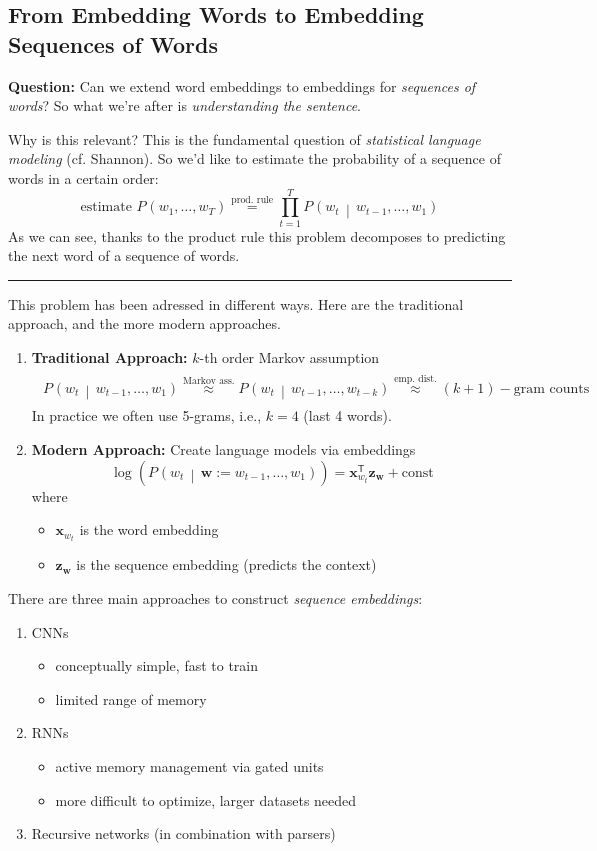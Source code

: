 \documentclass[a2paper,8pt]{extarticle}
\newcommand\pro{\item[$+$]}
\newcommand\con{\item[$-$]}
\newcommand{\Prob}[2][]{P_{#1}\left( #2 \right)}
\newcommand{\cProb}[3][]{P_{#1}\left( #2 \,\middle|\, #3 \right)}
\newcommand*{\T}{\mathsf{T}}
\renewcommand{\vec}[1]{\mathbf{#1}}
\newcommand{\vw}{\vec{w}}
\newcommand{\vx}{\vec{x}}
\newcommand{\vz}{\vec{z}}
\newcommand{\sep}{\vspace{0pt}\noindent\hrule\vspace{0pt}}
\newcommand{\ssep}{\hdashrule[1.1ex]{\linewidth}{0.1pt}{0.3mm}\vspace{-6pt}}
\newcommand{\sep}{\vspace{5pt}\noindent\hrule\vspace{5pt}}
\newcommand{\ssep}{\hdashrule[1.1ex]{\linewidth}{0.1pt}{0.3mm}\vspace{-3pt}}
\begin{document}
\begin{landscape}
\begin{multicols*}{7}
\subsection{From Embedding Words to Embedding Sequences of Words}

\textbf{Question:} Can we extend word embeddings to embeddings for
\emph{sequences of words}? So what we're after is \emph{understanding the
sentence}.

\ssep

Why is this relevant? This is the fundamental question of \emph{statistical
language modeling} (cf. Shannon). So we'd like to estimate the probability of a
sequence of words in a certain order:
\[
\text{estimate }
\Prob{w_1,\ldots,w_T}
\stackrel{\text{prod. rule}}{=}
\prod_{t=1}^T
\cProb{w_t}{w_{t-1},\ldots,w_1}
\]
As we can see, thanks to the product rule this problem decomposes to predicting
the next word of a sequence of words.

\sep

This problem has been adressed in different ways. Here are the traditional
approach, and the more modern approaches.

\begin{enumerate}
  \item \textbf{Traditional Approach:} $k$-th order Markov assumption
\begin{gather*}
\begin{align*}
\cProb{w_t}{w_{t-1},\ldots,w_1}
\stackrel{\text{Markov ass.}}{\approx}
\cProb{w_t}{w_{t-1},\ldots,w_{t-k}}
\stackrel{\text{emp. dist.}}{\approx}
(k+1)-\text{gram counts}
\end{align*}
\end{gather*}
In practice we often use 5-grams, i.e., $k=4$ (last 4 words).
  \item \textbf{Modern Approach:} Create language models via embeddings
\[
\log\left(\cProb{w_t}{\vw:=w_{t-1},\ldots,w_{1}}\right)
=
\vx_{w_t}^\T\vz_{\vw}
+
\text{const}
\]
where
\begin{itemize}
  \item $\vx_{w_t}$ is the word embedding
  \item $\vz_{\vw}$ is the sequence embedding (predicts the context)
\end{itemize}
\end{enumerate}

\ssep

There are three main approaches to construct \emph{sequence embeddings}:
\begin{enumerate}
  \item CNNs
  \begin{itemize}
    \pro conceptually simple, fast to train
    \con limited range of memory 
  \end{itemize}
  \item RNNs
  \begin{itemize}
    \pro active memory management via gated units
    \con more difficult to optimize, larger datasets needed 
  \end{itemize}
  \item Recursive networks (in combination with parsers)
\end{enumerate}


\end{multicols*}
\end{landscape}
\end{document}
